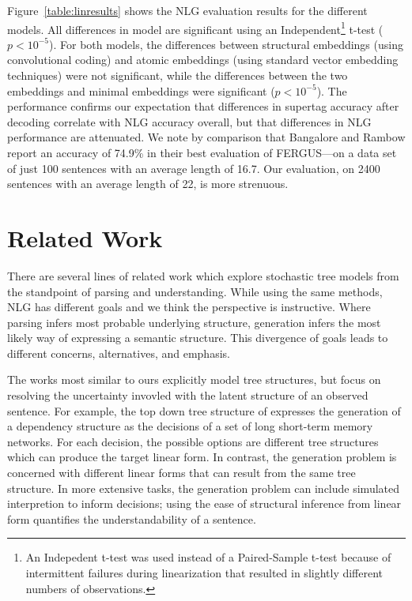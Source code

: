 \documentclass[11pt]{article}
\begin{document}
Figure~\ref{table:linresults} shows the NLG evaluation results for the
different models.
%
All differences in model are significant using an Independent\footnote{An Indepedent t-test was used instead of a Paired-Sample t-test because of intermittent failures during linearization that resulted in slightly different numbers of observations.} t-test ($p<10^{-5}$). 
%
For both models, the differences between structural embeddings (using convolutional coding) and atomic embeddings (using standard vector embedding techniques) were not significant, while the differences between the two embeddings and minimal embeddings were significant ($p<10^{-5}$). 
%
The performance confirms our expectation that differences in supertag
accuracy after decoding correlate with NLG accuracy overall, but that
differences in NLG performance are attenuated.
%
We note by comparison that Bangalore and Rambow report an accuracy of
74.9\% in their best evaluation of FERGUS---on a data set of just 100
sentences with an average length of 16.7.
%
Our evaluation, on 2400 sentences with an average length of 22, is
more strenuous.

\section{Related Work}
\label{sec:relatedwork}

There are several lines of related work which explore stochastic tree
models from the standpoint of parsing and understanding.
%
While using the same methods, NLG has different goals and we think the perspective is instructive. 
%
Where parsing infers most probable underlying structure, generation infers the most likely way of expressing a semantic structure.
%
This divergence of goals leads to different concerns, alternatives, and emphasis. 


The works most similar to ours explicitly model tree structures, but focus on resolving the uncertainty invovled with the latent structure of an observed sentence. 
%
For example, the top down tree structure of  expresses the generation of a dependency structure as the decisions of a set of long short-term memory networks.  
%
For each decision, the possible options are different tree structures which can produce the target linear form.
%
In contrast, the generation problem is concerned with different linear forms that can result from the same tree structure. 
%
In more extensive tasks, the generation problem can include simulated interpretion to inform decisions; using the ease of structural inference from linear form quantifies the understandability of a sentence. 
\end{document}
